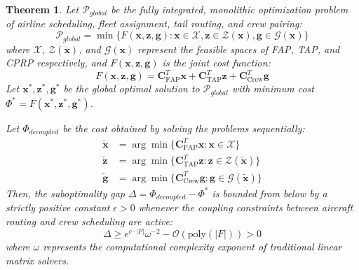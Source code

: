 \documentclass[11pt,a4paper]{book}
\newtheorem{theorem}{Theorem}
\begin{document}
\begin{theorem}
Let $\mathcal{P}_{global}$ be the fully integrated, monolithic optimization problem of airline scheduling, fleet assignment, tail routing, and crew pairing:
\begin{equation}
\mathcal{P}_{global} = \min \{ F(\mathbf{x}, \mathbf{z}, \mathbf{g}) : \mathbf{x} \in \mathcal{X}, \mathbf{z} \in \mathcal{Z}(\mathbf{x}), \mathbf{g} \in \mathcal{G}(\mathbf{x}) \}
\end{equation}
where $\mathcal{X}$, $\mathcal{Z}(\mathbf{x})$, and $\mathcal{G}(\mathbf{x})$ represent the feasible spaces of FAP, TAP, and CPRP respectively, and $F(\mathbf{x}, \mathbf{z}, \mathbf{g})$ is the joint cost function:
\begin{equation}
F(\mathbf{x}, \mathbf{z}, \mathbf{g}) = \mathbf{C}_{\text{FAP}}^T \mathbf{x} + \mathbf{C}_{\text{TAP}}^T \mathbf{z} + \mathbf{C}_{\text{Crew}}^T \mathbf{g}
\end{equation}
Let $\mathbf{x}^*, \mathbf{z}^*, \mathbf{g}^*$ be the global optimal solution to $\mathcal{P}_{global}$ with minimum cost $\Phi^* = F(\mathbf{x}^*, \mathbf{z}^*, \mathbf{g}^*)$.

Let $\Phi_{decoupled}$ be the cost obtained by solving the problems sequentially:
\begin{align}
\mathbf{\tilde{x}} &= \arg\min \{ \mathbf{C}_{\text{FAP}}^T \mathbf{x} : \mathbf{x} \in \mathcal{X} \} \\
\mathbf{\tilde{z}} &= \arg\min \{ \mathbf{C}_{\text{TAP}}^T \mathbf{z} : \mathbf{z} \in \mathcal{Z}(\mathbf{\tilde{x}}) \} \\
\mathbf{\tilde{g}} &= \arg\min \{ \mathbf{C}_{\text{Crew}}^T \mathbf{g} : \mathbf{g} \in \mathcal{G}(\mathbf{\tilde{x}}) \}
\end{align}
Then, the suboptimality gap $\Delta = \Phi_{decoupled} - \Phi^*$ is bounded from below by a strictly positive constant $\epsilon > 0$ whenever the coupling constraints between aircraft routing and crew scheduling are active:
\begin{equation}
\Delta \geq e^{c \cdot |F|} \omega^{-2} - \mathcal{O}(\text{poly}(|F|)) > 0
\end{equation}
where $\omega$ represents the computational complexity exponent of traditional linear matrix solvers.
\end{theorem}
\end{document}
